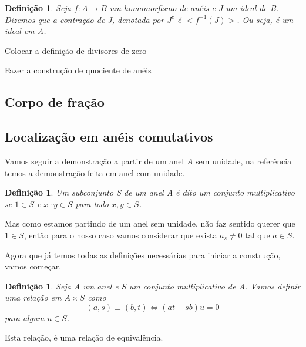 \documentclass[10pt,a4paper]{article}
\newtheorem{definition}[theorem]{Definição}
\begin{document}
\begin{definition}
	Seja $f:A \rightarrow B$ um homomorfismo de anéis e J um ideal de B. Dizemos que a contração de J, denotada por $J^{c}$ é $<f^{-1}(J)>$. Ou seja, é um ideal em A.
\end{definition}


 Colocar a definição de divisores de zero

 Fazer a construção de quociente de anéis


\subsection{Corpo de fração}

\subsection{Localização em anéis comutativos}

Vamos seguir a demonstração a partir de um anel $A$ sem unidade, na referência \cite{Atiyah} temos a demonstração feita em anel com unidade.

\begin{definition}
	Um subconjunto S de um anel A é dito um conjunto multiplicativo se $1 \in S$ e $ x\cdot y \in S$ para todo $x , y \in S$.
\end{definition}

Mas como estamos partindo de um anel sem unidade, não faz sentido querer que $1 \in S$, então para o nosso caso vamos considerar que exista $a_s \neq 0$ tal que $a \in S$.

Agora que já temos todas as definições necessárias para iniciar a construção, vamos começar.

\begin{definition}
	Seja A um anel e S um conjunto multiplicativo de A. Vamos definir uma relação em $A \times S$ como $$(a,s) \equiv (b, t) \Leftrightarrow (at-sb)u=0$$ para algum $u \in S$.
\end{definition}

Esta relação, é uma relação de equivalência.
\end{document}
